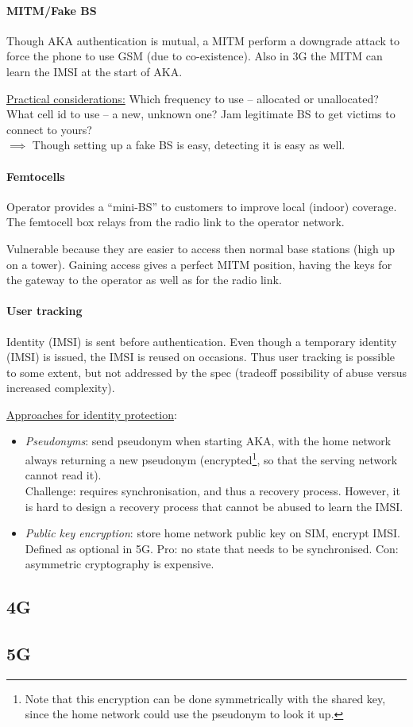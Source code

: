 \paragraph{MITM/Fake BS}
Though AKA authentication is mutual, a MITM perform a downgrade attack to force the phone to use GSM (due to co-existence).
Also in 3G the MITM can learn the IMSI at the start of AKA.

\underline{Practical considerations:}
Which frequency to use -- allocated or unallocated?
What cell id to use -- a new, unknown one?
Jam legitimate BS to get victims to connect to yours?
\\
$\implies$ Though setting up a fake BS is easy, detecting it is easy as well.

\paragraph{Femtocells}
Operator provides a ``mini-BS'' to customers to improve local (indoor) coverage.
The femtocell box relays from the radio link to the operator network.

Vulnerable because they are easier to access then normal base stations (high up on a tower).
Gaining access gives a perfect MITM position, having the keys for the gateway to the operator as well as for the radio link.

\paragraph{User tracking}
Identity (IMSI) is sent before authentication.
Even though a temporary identity (IMSI) is issued, the IMSI is reused on occasions.
Thus user tracking is possible to some extent, but not addressed by the spec (tradeoff possibility of abuse versus increased complexity).

\underline{Approaches for identity protection}:
\begin{itemize}
	\item \textit{Pseudonyms}: send pseudonym when starting AKA, with the home network always returning a new pseudonym
	(encrypted\footnote{Note that this encryption can be done symmetrically with the shared key, since the home network could use the pseudonym to look it up.}, so that the serving network cannot read it).\\
	Challenge: requires synchronisation, and thus a recovery process.
	However, it is hard to design a recovery process that cannot be abused to learn the IMSI.
	\item \textit{Public key encryption}: store home network public key on SIM, encrypt IMSI.
	Defined as optional in 5G.
	Pro: no state that needs to be synchronised.
	Con: asymmetric cryptography is expensive.
\end{itemize}


\subsection{4G}


\subsection{5G}

